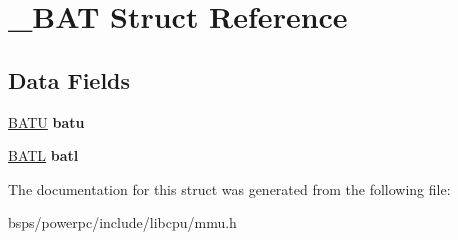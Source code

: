 \hypertarget{struct__BAT}{}\section{\+\_\+\+B\+AT Struct Reference}
\label{struct__BAT}
\subsection*{Data Fields}
\begin{DoxyCompactItemize}
\item 
\mbox{\label{struct__BAT_a5d14a9e20e50285c8a5035234102d168}} 
\mbox{\hyperlink{struct__BATU}{B\+A\+TU}} {\bfseries batu}
\item 
\mbox{\label{struct__BAT_abb52d5a574e9699f5ce6c98ac31840d6}} 
\mbox{\hyperlink{struct__BATL}{B\+A\+TL}} {\bfseries batl}
\end{DoxyCompactItemize}


The documentation for this struct was generated from the following file\+:\begin{DoxyCompactItemize}
\item 
bsps/powerpc/include/libcpu/mmu.\+h\end{DoxyCompactItemize}
